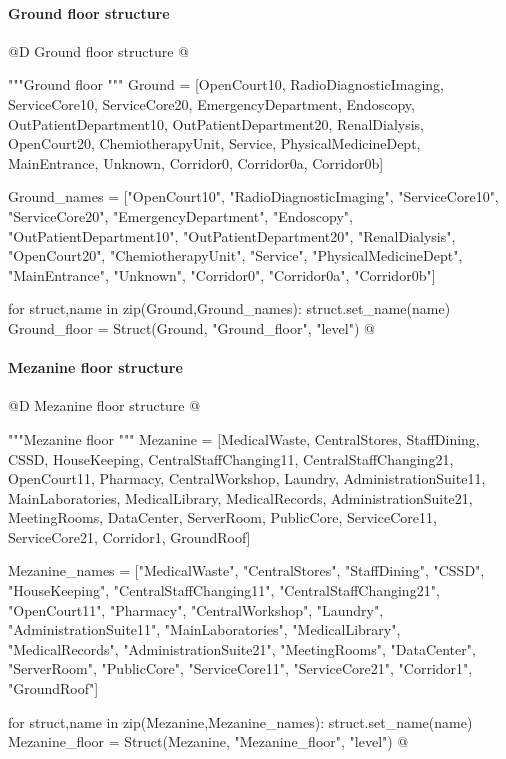 \documentclass[11pt,oneside]{article}    %
\begin{document}
\paragraph{Ground floor structure}
@D Ground floor structure
@{"""Ground floor """
Ground = [OpenCourt10, RadioDiagnosticImaging,
    ServiceCore10, ServiceCore20,  EmergencyDepartment, Endoscopy,
    OutPatientDepartment10, OutPatientDepartment20, RenalDialysis,
    OpenCourt20, ChemiotherapyUnit, Service, PhysicalMedicineDept,
    MainEntrance, Unknown, Corridor0, Corridor0a, Corridor0b]
    
Ground_names = ["OpenCourt10", "RadioDiagnosticImaging",
    "ServiceCore10", "ServiceCore20", "EmergencyDepartment", "Endoscopy",
    "OutPatientDepartment10", "OutPatientDepartment20", "RenalDialysis",
    "OpenCourt20", "ChemiotherapyUnit", "Service", "PhysicalMedicineDept",
    "MainEntrance", "Unknown", "Corridor0", "Corridor0a", "Corridor0b"]

for struct,name in zip(Ground,Ground_names): struct.set_name(name)
Ground_floor = Struct(Ground, "Ground_floor", "level")
@}

\paragraph{Mezanine floor structure}
@D Mezanine floor structure
@{"""Mezanine floor """
Mezanine = [MedicalWaste, CentralStores,
    StaffDining, CSSD, HouseKeeping,  CentralStaffChanging11,
    CentralStaffChanging21, OpenCourt11, Pharmacy, CentralWorkshop, Laundry,
    AdministrationSuite11, MainLaboratories, MedicalLibrary, MedicalRecords,
    AdministrationSuite21, MeetingRooms, DataCenter, ServerRoom, PublicCore,
    ServiceCore11, ServiceCore21, Corridor1, GroundRoof]

Mezanine_names = ["MedicalWaste", "CentralStores",
    "StaffDining", "CSSD", "HouseKeeping", "CentralStaffChanging11",
    "CentralStaffChanging21", "OpenCourt11", "Pharmacy", "CentralWorkshop", "Laundry",
    "AdministrationSuite11", "MainLaboratories", "MedicalLibrary", "MedicalRecords",
    "AdministrationSuite21", "MeetingRooms", "DataCenter", "ServerRoom", "PublicCore",
    "ServiceCore11", "ServiceCore21", "Corridor1", "GroundRoof"]

for struct,name in zip(Mezanine,Mezanine_names): struct.set_name(name)
Mezanine_floor = Struct(Mezanine, "Mezanine_floor", "level")
@}
\end{document}
